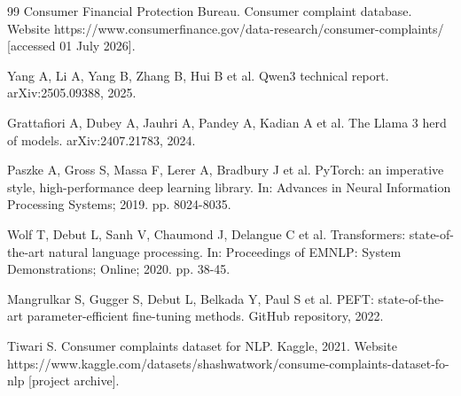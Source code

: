 \documentclass{elektr}
\begin{document}
\begin{thebibliography}{99}
 Consumer Financial Protection Bureau. Consumer complaint database. Website https://www.consumerfinance.gov/data-research/consumer-complaints/ [accessed 01 July 2026].

 Yang A, Li A, Yang B, Zhang B, Hui B et al. Qwen3 technical report. arXiv:2505.09388, 2025.

 Grattafiori A, Dubey A, Jauhri A, Pandey A, Kadian A et al. The Llama 3 herd of models. arXiv:2407.21783, 2024.

 Paszke A, Gross S, Massa F, Lerer A, Bradbury J et al. PyTorch: an imperative style, high-performance deep learning library. In: Advances in Neural Information Processing Systems; 2019. pp. 8024-8035.

 Wolf T, Debut L, Sanh V, Chaumond J, Delangue C et al. Transformers: state-of-the-art natural language processing. In: Proceedings of EMNLP: System Demonstrations; Online; 2020. pp. 38-45.

 Mangrulkar S, Gugger S, Debut L, Belkada Y, Paul S et al. PEFT: state-of-the-art parameter-efficient fine-tuning methods. GitHub repository, 2022.

 Tiwari S. Consumer complaints dataset for NLP. Kaggle, 2021. Website https://www.kaggle.com/datasets/shashwatwork/consume-complaints-dataset-fo-nlp [project archive].

\end{thebibliography}
\end{document}
